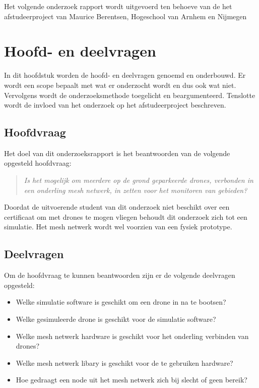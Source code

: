 \documentclass[a4paper, 11pt, oneside]{report}
\begin{document}
Het volgende onderzoek rapport wordt uitgevoerd ten behoeve van de het afstudeerproject van Maurice Berentsen, Hogeschool van Arnhem en Nijmegen


\chapter{Hoofd- en deelvragen}
In dit hoofdstuk worden de hoofd- en deelvragen genoemd en onderbouwd.
Er wordt een scope bepaalt met wat er onderzocht wordt en dus ook wat niet.
Vervolgens wordt de onderzoeksmethode toegelicht en beargumenteerd.
Tenslotte wordt de invloed van het onderzoek op het afstudeerproject beschreven.

\section{Hoofdvraag}
Het doel van dit onderzoeksrapport is het beantwoorden van de volgende opgesteld hoofdvraag:
\begin{quotation}
\textit{Is het mogelijk om meerdere op de grond geparkeerde drones, verbonden in een onderling mesh netwerk, in zetten voor het monitoren van gebieden?}	
\end{quotation}
Doordat de uitvoerende student van dit onderzoek niet beschikt over een certificaat om met drones te mogen vliegen behoudt dit onderzoek zich tot een simulatie.
Het mesh netwerk wordt wel voorzien van een fysiek prototype.

\section{Deelvragen}

Om de hoofdvraag te kunnen beantwoorden zijn er de volgende deelvragen opgesteld:

\begin{itemize}
	\item Welke simulatie software is geschikt om een drone in na te bootsen?
	\item Welke gesimuleerde drone is geschikt voor de simulatie software?
	\item Welke mesh netwerk hardware is geschikt voor het onderling verbinden van drones?
	\item Welke mesh netwerk libary is geschikt voor de te gebruiken hardware?
	\item Hoe gedraagt een node uit het mesh netwerk zich bij slecht of geen bereik?
\end{itemize}
\end{document}
